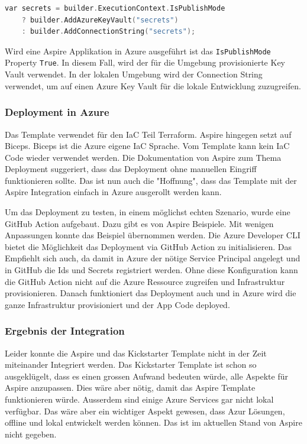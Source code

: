             \begin{lstlisting}[language=C, caption=Beispiel einer Integration von Azure Key Vault]
var secrets = builder.ExecutionContext.IsPublishMode
    ? builder.AddAzureKeyVault("secrets")
    : builder.AddConnectionString("secrets");
            \end{lstlisting}

            Wird eine Aspire Applikation in Azure ausgeführt ist das \verb|IsPublishMode| Property \verb|True|. In diesem Fall, wird der für die Umgebung provisionierte Key Vault verwendet. In der lokalen Umgebung wird der Connection String verwendet, um auf einen Azure Key Vault für die lokale Entwicklung zuzugreifen.

        \subsubsection{Deployment in Azure}

            Das Template verwendet für den IaC Teil Terraform. Aspire hingegen setzt auf Biceps. Biceps ist die Azure eigene IaC Sprache. Vom Template kann kein IaC Code wieder verwendet werden. Die Dokumentation von Aspire zum Thema Deployment suggeriert, dass das Deployment ohne manuellen Eingriff funktionieren sollte. Das ist nun auch die "Hoffnung", dass das Template mit der Aspire Integration einfach in Azure ausgerollt werden kann.

            Um das Deployment zu testen, in einem möglichst echten Szenario, wurde eine GitHub Action aufgebaut. Dazu gibt es von Aspire Beispiele. Mit wenigen Anpassungen konnte das Beispiel übernommen werden. Die Azure Developer CLI bietet die Möglichkeit das Deployment via GitHub Action zu initialisieren. Das Empfiehlt sich auch, da damit in Azure der nötige Service Principal angelegt und in GitHub die Ids und Secrets registriert werden. Ohne diese Konfiguration kann die GitHub Action nicht auf die Azure Ressource zugreifen und Infrastruktur provisionieren. Danach funktioniert das Deployment auch und in Azure wird die ganze Infrastruktur provisioniert und der App Code deployed.

        \subsubsection{Ergebnis der Integration}
            Leider konnte die Aspire und das Kickstarter Template nicht in der Zeit miteinander Integriert werden. Das Kickstarter Template ist schon so ausgeklügelt, dass es einen grossen Aufwand bedeuten würde, alle Aspekte für Aspire anzupassen. Dies wäre aber nötig, damit das Aspire Template funktionieren würde. Ausserdem sind einige Azure Services gar nicht lokal verfügbar. Das wäre aber ein wichtiger Aspekt gewesen, dass Azur Lösungen, offline und lokal entwickelt werden können. Das ist im aktuellen Stand von Aspire nicht gegeben. 

